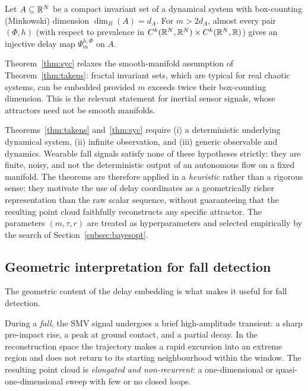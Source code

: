 \begin{theorem}
\label{thm:syc}
Let $A\subseteq\mathbb{R}^N$ be a compact invariant set of a dynamical system with box-counting (Minkowski) dimension $\dim_B(A)=d_A$. For $m>2d_A$, almost every pair $(\Phi,h)$ (with respect to prevalence in $C^k(\mathbb{R}^N,\mathbb{R}^N)\times C^k(\mathbb{R}^N,\mathbb{R})$) gives an injective delay map $\Psi^{h,\Phi}_m$ on $A$.
\end{theorem}

Theorem~\ref{thm:syc} relaxes the smooth-manifold assumption of Theorem~\ref{thm:takens}: fractal invariant sets, which are typical for real chaotic systems, can be embedded provided $m$ exceeds twice their box-counting dimension. This is the relevant statement for inertial sensor signals, whose attractors need not be smooth manifolds.

\begin{remark}
\label{rem:heuristic}
Theorems~\ref{thm:takens} and~\ref{thm:syc} require (i) a deterministic underlying dynamical system, (ii) infinite observation, and (iii) generic observable and dynamics. Wearable fall signals satisfy none of these hypotheses strictly: they are finite, noisy, and not the deterministic output of an autonomous flow on a fixed manifold. The theorems are therefore applied in a \emph{heuristic} rather than a rigorous sense: they motivate the use of delay coordinates as a geometrically richer representation than the raw scalar sequence, without guaranteeing that the resulting point cloud faithfully reconstructs any specific attractor. The parameters $(m,\tau,r)$ are treated as hyperparameters and selected empirically by the search of Section~\ref{subsec:bayesopt}.
\end{remark}

\subsection{Geometric interpretation for fall detection}
\label{subsubsec:geometry}

The geometric content of the delay embedding is what makes it useful for fall detection.

During a \emph{fall}, the SMV signal undergoes a brief high-amplitude transient: a sharp pre-impact rise, a peak at ground contact, and a partial decay. In the reconstruction space the trajectory makes a rapid excursion into an extreme region and does not return to its starting neighbourhood within the window. The resulting point cloud is \emph{elongated and non-recurrent}: a one-dimensional or quasi-one-dimensional sweep with few or no closed loops.

